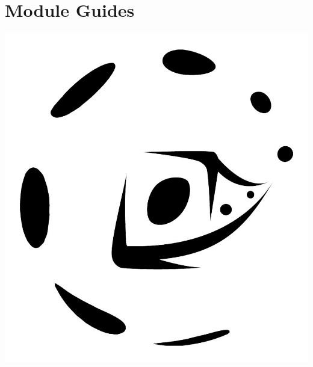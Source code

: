 \documentclass{memoir}\usepackage{etoolbox}\newtoggle{printable}\toggletrue{printable}\newtoggle{isBeamer}\togglefalse{isBeamer}
\begin{document}
\chapter{Module Guides}

\includegraphics[width=\textwidth]{GamesLogoAt}




\newpage



\newpage


\end{document}
